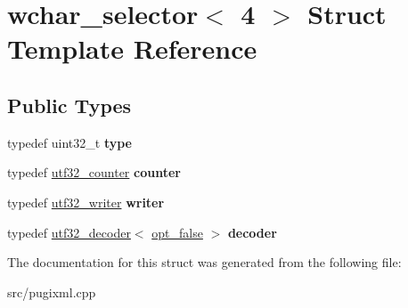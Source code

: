 \hypertarget{structwchar__selector_3_014_01_4}{}\section{wchar\+\_\+selector$<$ 4 $>$ Struct Template Reference}
\label{structwchar__selector_3_014_01_4}
\subsection*{Public Types}
\begin{DoxyCompactItemize}
\item 
\mbox{\label{structwchar__selector_3_014_01_4_af45ac603ab6fefec66e5c29044b4eed6}} 
typedef uint32\+\_\+t {\bfseries type}
\item 
\mbox{\label{structwchar__selector_3_014_01_4_a7d7c585ae0819660112b8c8683971b97}} 
typedef \hyperlink{structutf32__counter}{utf32\+\_\+counter} {\bfseries counter}
\item 
\mbox{\label{structwchar__selector_3_014_01_4_a48042e7fe51c4661397ae7afe3905243}} 
typedef \hyperlink{structutf32__writer}{utf32\+\_\+writer} {\bfseries writer}
\item 
\mbox{\label{structwchar__selector_3_014_01_4_add0a8302007d5e5def40457afc32ba78}} 
typedef \hyperlink{structutf32__decoder}{utf32\+\_\+decoder}$<$ \hyperlink{structopt__false}{opt\+\_\+false} $>$ {\bfseries decoder}
\end{DoxyCompactItemize}


The documentation for this struct was generated from the following file\+:\begin{DoxyCompactItemize}
\item 
src/pugixml.\+cpp\end{DoxyCompactItemize}
